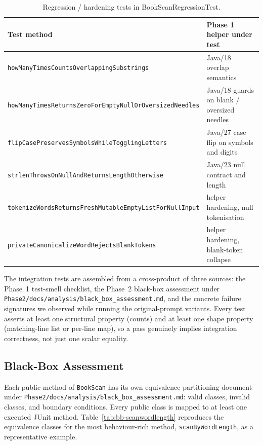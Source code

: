 \documentclass[journal]{IEEEtran}
\begin{document}
\begin{table}[!t]
\renewcommand{\arraystretch}{1.15}
\caption{Regression / hardening tests in BookScanRegressionTest.}
\label{tab:reg-tests}
\centering
\footnotesize
\begin{tabular}{@{}p{6.0cm}p{10.0cm}@{}}
\toprule
\textbf{Test method} & \textbf{Phase 1 helper under test} \\
\midrule
\texttt{howManyTimesCounts}\-\texttt{OverlappingSubstrings} & Java/18 overlap semantics \\
\texttt{howManyTimesReturnsZeroFor}\-\texttt{EmptyNullOrOversizedNeedles} & Java/18 guards on blank / oversized needles \\
\texttt{flipCasePreservesSymbols}\-\texttt{WhileTogglingLetters} & Java/27 case flip on symbols and digits \\
\texttt{strlenThrowsOnNullAnd}\-\texttt{ReturnsLengthOtherwise} & Java/23 null contract and length \\
\texttt{tokenizeWordsReturnsFresh}\-\texttt{MutableEmptyListForNullInput} & helper hardening, null tokenisation \\
\texttt{privateCanonicalizeWord}\-\texttt{RejectsBlankTokens} & helper hardening, blank-token collapse \\
\bottomrule
\end{tabular}
\end{table}

The integration tests are assembled from a cross-product of three sources:
the Phase~1 test-smell checklist, the Phase~2 black-box assessment under
\texttt{Phase2/docs/analysis/black\_box\_assessment.md}, and the concrete
failure signatures we observed while running the original-prompt variants.
Every test asserts at least one structural property (counts) and at least
one shape property (matching-line list or per-line map), so a pass
genuinely implies integration correctness, not just one scalar equality.

\subsection{Black-Box Assessment}

Each public method of \texttt{BookScan} has its own
equivalence-partitioning document under
\texttt{Phase2/docs/analysis/black\_box\_assessment.md}: valid classes,
invalid classes, and boundary conditions. Every public class is mapped to
at least one executed JUnit method. Table~\ref{tab:bb-scanwordlength}
reproduces the equivalence classes for the most behaviour-rich method,
\texttt{scanByWordLength}, as a representative example.
\end{document}
